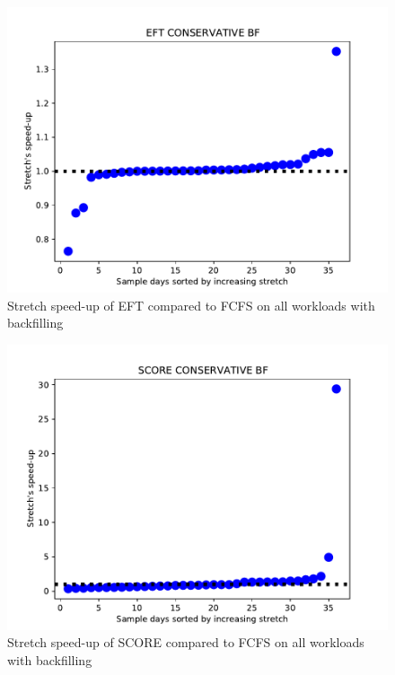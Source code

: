\documentclass[conference,10pt]{IEEEtran}
\begin{document}
\begin{figure}\centering\includegraphics[width=1\linewidth]{../MBSS/plot/Scatter/scatter_mean_stretch_all_workloads_bf_EFT-CONSERVATIVE-BF.pdf}\caption{Stretch speed-up of EFT compared to FCFS on all workloads with backfilling}\end{figure}
\begin{figure}\centering\includegraphics[width=1\linewidth]{../MBSS/plot/Scatter/scatter_mean_stretch_all_workloads_bf_SCORE-CONSERVATIVE-BF.pdf}\caption{Stretch speed-up of SCORE compared to FCFS on all workloads with backfilling}\end{figure}
\end{document}
